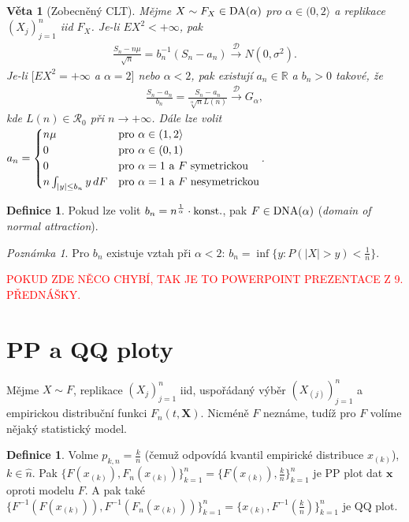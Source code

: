 \documentclass{article}
\newtheorem{theorem}[subsubsection]{Věta}
\theoremstyle{remark}
\newtheorem*{remark}{Poznámka}
\theoremstyle{plain}
\theoremstyle{definition}
\newtheorem{definition}[subsubsection]{Definice}
\theoremstyle{remark}
\begin{document}
\begin{theorem}[Zobecněný CLT]
Mějme $X\sim F_X\in\textnormal{DA}(\alpha)$ pro $\alpha\in(0,2\rangle$ a replikace $(X_j)_{j=1}^n$ iid $F_X$. Je-li $EX^2<+\infty$, pak
\begin{align*}
    \frac{S_n-n\mu}{\sqrt{n}}=b_n^{-1}(S_n-a_n)\xrightarrow{\mathscr{D}}N(0,\sigma^2).
\end{align*}
Je-li $\big[EX^2=+\infty$ a $\alpha=2\big]$ nebo $\alpha<2$, pak existují $a_n\in\mathbb{R}$ a $b_n>0$ takové, že 
\begin{align*}
    \frac{S_n-a_n}{b_n}=\frac{S_n-a_n}{\sqrt[\alpha]{n}L(n)}\xrightarrow{\mathscr{D}}G_\alpha,
\end{align*}
kde $L(n)\in\mathcal{R}_0$ při $n\rightarrow +\infty$. Dále lze volit $a_n=\begin{cases}
n\mu & \textnormal{pro }\alpha\in(1,2\rangle \\
0 & \textnormal{pro } \alpha\in(0,1) \\
0 & \textnormal{pro } \alpha=1 \textnormal{ a } F \textnormal{ symetrickou} \\
n\int_{|y|\leq b_n}y\,dF & \textnormal{pro }\alpha=1 \textnormal{ a } F \textnormal{ nesymetrickou}
\end{cases}$.
\end{theorem}

\begin{definition}
Pokud lze volit $b_n=n^{\frac{1}{\alpha}}\cdot\textnormal{konst.}$, pak $F\in\textnormal{DNA}(\alpha)$ (\textit{domain of normal attraction}).
\end{definition}

\begin{remark}
Pro $b_n$ existuje vztah při $\alpha<2$: $b_n=\inf\big\{y:P(|X|>y)<\frac{1}{n}\big\}$.  
\end{remark}

\textcolor{red}{POKUD ZDE NĚCO CHYBÍ, TAK JE TO POWERPOINT PREZENTACE Z 9. PŘEDNÁŠKY.}

\section{PP a QQ ploty}

Mějme $X\sim F$, replikace $(X_j)_{j=1}^n$ iid, uspořádaný výběr $(X_{(j)})_{j=1}^n$ a empirickou distribuční funkci $F_n(t,\textbf{X})$. Nicméně $F$ neznáme, tudíž pro $F$ volíme nějaký statistický model. 

\begin{definition}
Volme $p_{k,n}=\frac{k}{n}$ (čemuž odpovídá kvantil empirické distribuce $x_{(k)}$), $k\in\widehat{n}$. Pak $\big\{F(x_{(k)}),F_n(x_{(k)})\big\}_{k=1}^n =\big\{F(x_{(k)}),\frac{k}{n}\big\}_{k=1}^n$ je PP plot dat $\textbf{x}$ oproti modelu $F$. A pak také\newline $\big\{F^{-1}(F(x_{(k)})),F^{-1}(F_n(x_{(k)}))\big\}_{k=1}^n=\big\{x_{(k)},F^{-1}(\frac{k}{n})\big\}_{k=1}^n$ je QQ plot.
\end{definition}
\end{document}
